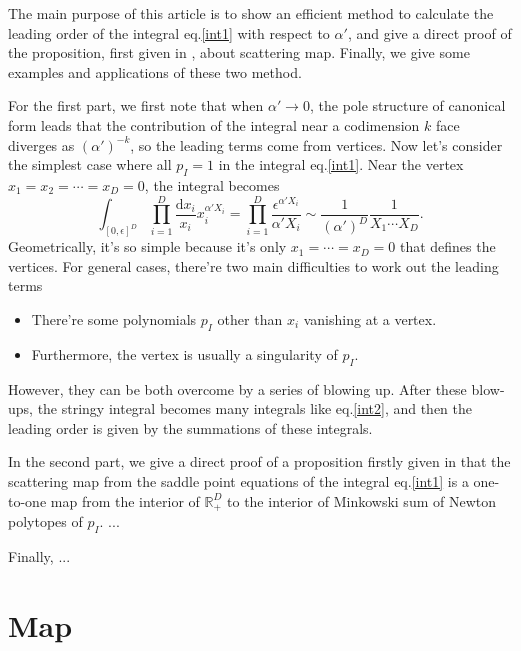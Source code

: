 \documentclass[12pt]{article}
\theoremstyle{definition}
\theoremstyle{plain}
\newcommand{\dif}{\mathrm{d}} %
\begin{document}
The main purpose of this article is to show an efficient method to 
calculate the leading order of the integral eq.\eqref{int1} with respect to $\alpha'$, 
and give a direct proof of the proposition, first given in \cite{}, about scattering map.
Finally, we give some examples and applications of these two method.


For the first part, we first note that when $\alpha'\to 0$, the pole structure of 
canonical form leads that the contribution of the integral near a codimension $k$ face
diverges as $(\alpha')^{-k}$, so the leading terms come from vertices.
Now let's consider the simplest case where all $p_I=1$ in the integral eq.\eqref{int1}.
Near the vertex $x_1=x_2=\cdots=x_D=0$, the integral becomes
\begin{equation}\label{int2}
	\int_{[0,\epsilon]^D}\prod_{i=1}^D\frac{\dif x_i}{x_i}x_i^{\alpha' X_i}
	=\prod_{i=1}^D\frac{\epsilon^{\alpha' X_i}}{\alpha' X_i}
	\sim \frac{1}{(\alpha')^D}\frac{1}{X_1\cdots X_D}.
\end{equation}
Geometrically, it's so simple because it's only $x_1=\cdots=x_D=0$ that defines the vertices. 
For general cases, there're two main difficulties to work out the leading terms
\begin{itemize}
	\item There're some polynomials $p_I$ other than $x_i$ vanishing at a vertex.
	\item Furthermore, the vertex is usually a singularity of $p_I$.
\end{itemize}
However, they can be both overcome by a series of blowing up. After these blow-ups, the 
stringy integral becomes many integrals like eq.\eqref{int2}, and then the leading order
is given by the summations of these integrals.

In the second part, we give a direct proof of a proposition firstly given in \cite{} that 
the scattering map from the saddle point equations of the integral eq.\eqref{int1} 
is a one-to-one map from the interior of $\mathbb R_+^D$ to the interior of Minkowski sum of 
Newton polytopes of $p_I$. ...

Finally, ...

\section{Map}
\end{document}
